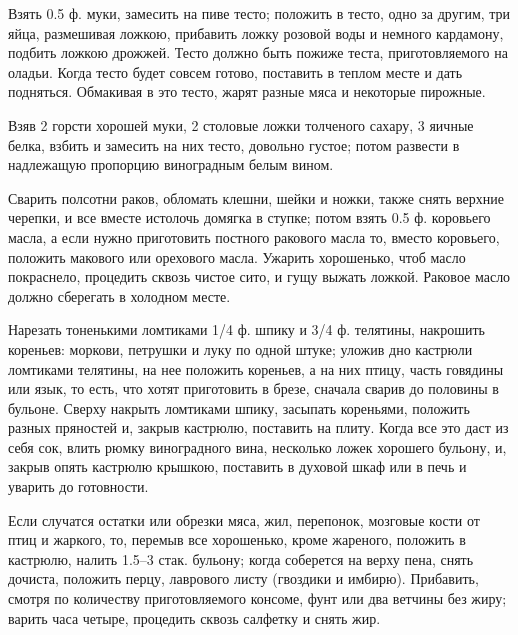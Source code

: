 
Взять 0.5 ф. муки, замесить на пиве тесто; положить в тесто, одно за другим, три яйца, размешивая ложкою, прибавить ложку розовой воды и немного кардамону, подбить ложкою дрожжей. Тесто должно быть пожиже теста, приготовляемого на оладьи. Когда тесто будет совсем готово, поставить в теплом месте и дать подняться. Обмакивая в это тесто, жарят разные мяса и некоторые пирожные.


Взяв 2 горсти хорошей муки, 2 столовые ложки толченого сахару, 3 яичные белка, взбить и замесить на них тесто, довольно густое; потом развести в надлежащую пропорцию виноградным белым вином.


Сварить полсотни раков, обломать клешни, шейки и ножки, также снять верхние черепки, и все вместе истолочь домягка в ступке; потом взять 0.5 ф. коровьего масла, а если нужно приготовить постного ракового масла то, вместо коровьего, положить макового или орехового масла. Ужарить хорошенько, чтоб масло покраснело, процедить сквозь чистое сито, и гущу выжать ложкой. Раковое масло должно сберегать в холодном месте.


Нарезать тоненькими ломтиками 1/4 ф. шпику и 3/4 ф. телятины, накрошить кореньев: моркови, петрушки и луку по одной штуке; уложив дно кастрюли ломтиками телятины, на нее положить кореньев, а на них птицу, часть говядины или язык, то есть, что хотят приготовить в брезе, сначала сварив до половины в бульоне. Сверху накрыть ломтиками шпику, засыпать кореньями, положить разных пряностей и, закрыв кастрюлю, поставить на плиту. Когда все это даст из себя сок, влить рюмку виноградного вина, несколько ложек хорошего бульону, и, закрыв опять кастрюлю крышкою, поставить в духовой шкаф или в печь и уварить до готовности.


Если случатся остатки или обрезки мяса, жил, перепонок, мозговые кости от птиц и жаркого, то, перемыв все хорошенько, кроме жареного, положить в кастрюлю, налить 1.5--3 стак. бульону; когда соберется на верху пена, снять дочиста, положить перцу, лаврового листу (гвоздики и имбирю). Прибавить, смотря по количеству приготовляемого консоме, фунт или два ветчины без жиру; варить часа четыре, процедить сквозь салфетку и снять жир.


